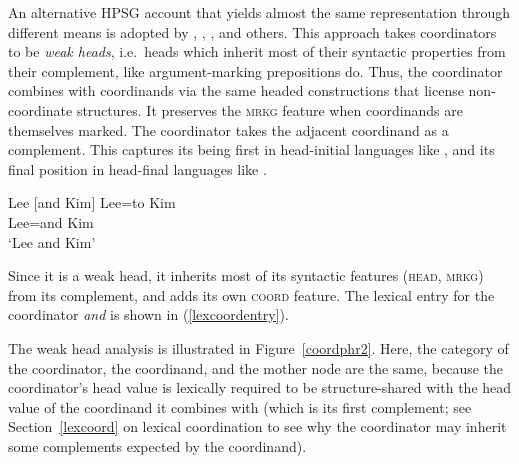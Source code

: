\begin{sloppypar}
An alternative HPSG account that yields almost the same representation through different means is adopted by \citet{Abeille:03,Abeille:05}, \citet{Mouret:07}, \citet{Bilbiie:17}, and others. This approach
takes coordinators to be \emph{weak heads}, i.e.\ heads which inherit most of their syntactic properties from their complement,
like argument-marking prepositions do. Thus, the coordinator combines with coordinands via the same headed constructions that license non-coordinate structures.
It  preserves the \textsc{mrkg} feature when coordinands are themselves marked. The coordinator takes the adjacent coordinand as a complement. This captures its being first in head-initial languages like , and its final position in head-final languages like .
\end{sloppypar}

\eal
\settowidth{}
\ex Lee [and Kim]
\ex 
\gll Lee=to Kim\\
     Lee=and Kim\\
\glt `Lee and Kim'
\zl

\noindent
Since it is a weak head, it inherits most of  its syntactic features (\textsc{head}, \textsc{mrkg}) from its complement, and adds its own  \textsc{coord} feature. The lexical entry for the coordinator \emph{and} is shown in (\ref{lexcoordentry}).

\ea 
{}\label{lexcoordentry}
\z

\noindent
The weak head analysis is illustrated in
Figure~\ref{coordphr2}. Here, the category of the coordinator, the coordinand, and the mother node are the same, because the coordinator's head value is lexically required
to be structure-shared with the head value of the coordinand it combines with (which is its first complement; see Section~\ref{lexcoord} on lexical coordination to see why the coordinator may inherit some complements expected by the coordinand).


